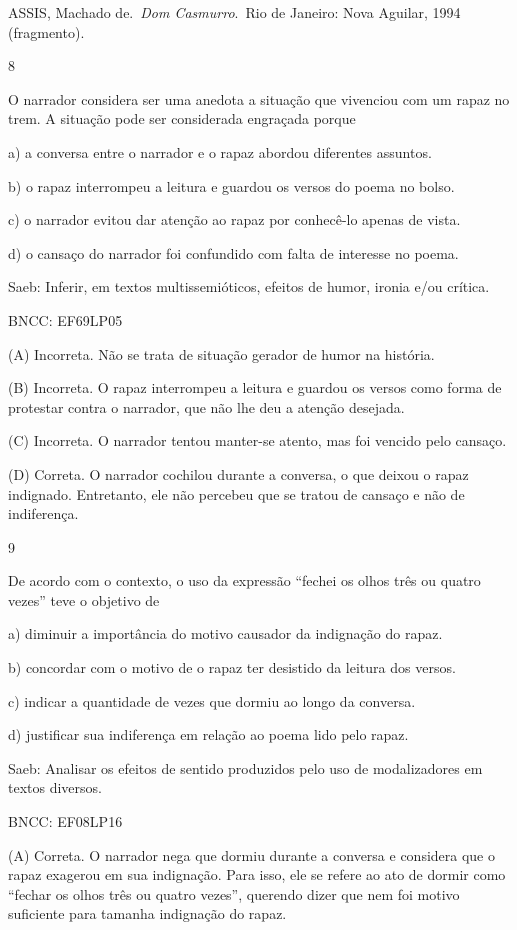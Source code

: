 ASSIS, Machado de.~\emph{Dom Casmurro}.~Rio de Janeiro: Nova Aguilar,
1994 (fragmento).

\num{8}

O narrador considera ser uma anedota a situação que vivenciou com um
rapaz no trem. A situação pode ser considerada engraçada porque

a) a conversa entre o narrador e o rapaz abordou diferentes assuntos.

b) o rapaz interrompeu a leitura e guardou os versos do poema no bolso.

c) o narrador evitou dar atenção ao rapaz por conhecê-lo apenas de
vista.

d) o cansaço do narrador foi confundido com falta de interesse no poema.

Saeb: Inferir, em textos multissemióticos, efeitos de humor, ironia e/ou
crítica.

BNCC: EF69LP05

(A) Incorreta. Não se trata de situação gerador de humor na história.

(B) Incorreta. O rapaz interrompeu a leitura e guardou os versos como
forma de protestar contra o narrador, que não lhe deu a atenção
desejada.

(C) Incorreta. O narrador tentou manter-se atento, mas foi vencido pelo
cansaço.

(D) Correta. O narrador cochilou durante a conversa, o que deixou o
rapaz indignado. Entretanto, ele não percebeu que se tratou de cansaço e
não de indiferença.

\num{9}

De acordo com o contexto, o uso da expressão ``fechei os olhos três ou
quatro vezes'' teve o objetivo de

a) diminuir a importância do motivo causador da indignação do rapaz.

b) concordar com o motivo de o rapaz ter desistido da leitura dos
versos.

c) indicar a quantidade de vezes que dormiu ao longo da conversa.

d) justificar sua indiferença em relação ao poema lido pelo rapaz.

Saeb: Analisar os efeitos de sentido produzidos pelo uso de
modalizadores em textos diversos.

BNCC: EF08LP16

(A) Correta. O narrador nega que dormiu durante a conversa e considera
que o rapaz exagerou em sua indignação. Para isso, ele se refere ao ato
de dormir como ``fechar os olhos três ou quatro vezes'', querendo dizer
que nem foi motivo suficiente para tamanha indignação do rapaz.

